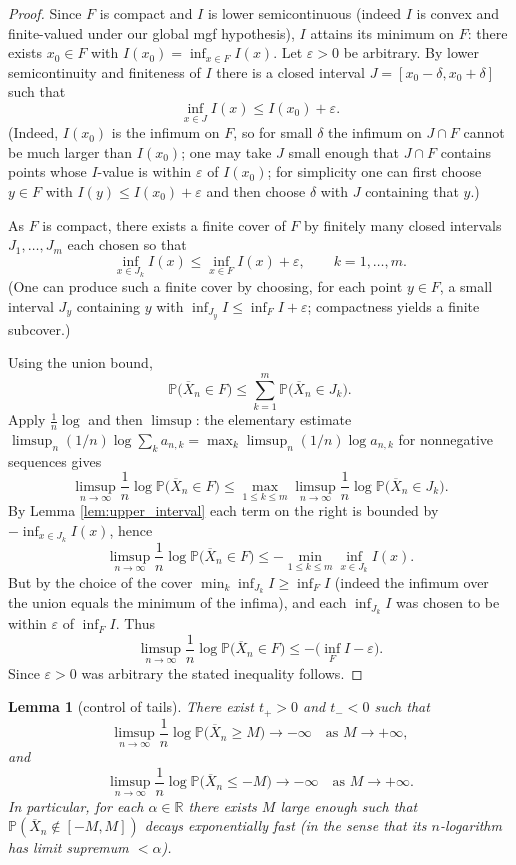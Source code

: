 \documentclass[12pt]{article}
\newtheorem{lemma}[theorem]{Lemma}
\theoremstyle{definition}
\theoremstyle{remark}
\begin{document}
\begin{proof}
Since $F$ is compact and $I$ is lower semicontinuous (indeed $I$ is convex and
finite-valued under our global mgf hypothesis), $I$ attains its minimum on $F$:
there exists $x_0\in F$ with $I(x_0)=\inf_{x\in F} I(x)$. Let $\varepsilon>0$ be
arbitrary. By lower semicontinuity and finiteness of $I$ there is a closed interval
$J=[x_0-\delta,x_0+\delta]$ such that
\[
\inf_{x\in J} I(x) \le I(x_0)+\varepsilon.
\]
(Indeed, $I(x_0)$ is the infimum on $F$, so for small $\delta$ the infimum on
$J\cap F$ cannot be much larger than $I(x_0)$; one may take $J$ small enough that
$J\cap F$ contains points whose $I$-value is within $\varepsilon$ of $I(x_0)$;
for simplicity one can first choose $y\in F$ with $I(y)\le I(x_0)+\varepsilon$
and then choose $\delta$ with $J$ containing that $y$.)

As $F$ is compact, there exists a finite cover of $F$ by finitely many closed
intervals $J_1,\dots,J_m$ each chosen so that
\[
\inf_{x\in J_k} I(x) \le \inf_{x\in F} I(x) + \varepsilon, \qquad k=1,\dots,m.
\]
(One can produce such a finite cover by choosing, for each point $y\in F$, a small
interval $J_y$ containing $y$ with $\inf_{J_y} I \le \inf_F I + \varepsilon$;
compactness yields a finite subcover.)

Using the union bound,
\[
\mathbb{P}\big(\overline X_n\in F\big) \le \sum_{k=1}^m \mathbb{P}\big(\overline X_n\in J_k\big).
\]
Apply $\frac{1}{n}\log$ and then $\limsup$: the elementary estimate
\(\limsup_{n}(1/n)\log\sum_{k} a_{n,k} = \max_k \limsup_{n}(1/n)\log a_{n,k}\) for
nonnegative sequences gives
\[
\limsup_{n\to\infty}\frac{1}{n}\log \mathbb{P}\big(\overline X_n\in F\big)
\le \max_{1\le k\le m} \limsup_{n\to\infty}\frac{1}{n}\log \mathbb{P}\big(\overline X_n\in J_k\big).
\]
By Lemma \ref{lem:upper_interval} each term on the right is bounded by
\(-\inf_{x\in J_k} I(x)\), hence
\[
\limsup_{n\to\infty}\frac{1}{n}\log \mathbb{P}\big(\overline X_n\in F\big)
\le -\min_{1\le k\le m} \inf_{x\in J_k} I(x).
\]
But by the choice of the cover $\min_k \inf_{J_k} I \ge \inf_F I$ (indeed the
infimum over the union equals the minimum of the infima), and each $\inf_{J_k} I$
was chosen to be within $\varepsilon$ of $\inf_F I$. Thus
\[
\limsup_{n\to\infty}\frac{1}{n}\log \mathbb{P}\big(\overline X_n\in F\big)
\le -\big( \inf_F I - \varepsilon \big).
\]
Since $\varepsilon>0$ was arbitrary the stated inequality follows.
\end{proof}

\begin{lemma}[control of tails]\label{lem:tail_control}
There exist $t_+>0$ and $t_-<0$ such that
\[
\limsup_{n\to\infty}\frac{1}{n}\log \mathbb{P}\big( \overline X_n \ge M \big) \to -\infty
\quad\text{as }M\to+\infty,
\]
and
\[
\limsup_{n\to\infty}\frac{1}{n}\log \mathbb{P}\big( \overline X_n \le -M \big) \to -\infty
\quad\text{as }M\to+\infty.
\]
In particular, for each $\alpha\in\mathbb R$ there exists $M$ large enough such that
$\mathbb{P}(\overline X_n \not\in [-M,M])$ decays exponentially fast (in the sense
that its $n$-logarithm has limit supremum $<\alpha$).
\end{lemma}
\end{document}
